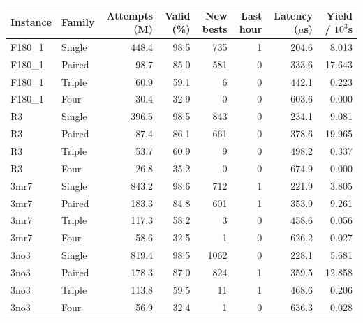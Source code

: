 \begin{tabular}{@{}llrrrrrr@{}}
\toprule
Instance & Family & Attempts (M) & Valid (\%) & New bests & Last hour & Latency ($\mu$s) & Yield / $10^3$s \\
\midrule
F180\_1 & Single & 448.4 & 98.5 & 735 & 1 & 204.6 & 8.013 \\
F180\_1 & Paired & 98.7 & 85.0 & 581 & 0 & 333.6 & 17.643 \\
F180\_1 & Triple & 60.9 & 59.1 & 6 & 0 & 442.1 & 0.223 \\
F180\_1 & Four & 30.4 & 32.9 & 0 & 0 & 603.6 & 0.000 \\
R3 & Single & 396.5 & 98.5 & 843 & 0 & 234.1 & 9.081 \\
R3 & Paired & 87.4 & 86.1 & 661 & 0 & 378.6 & 19.965 \\
R3 & Triple & 53.7 & 60.9 & 9 & 0 & 498.2 & 0.337 \\
R3 & Four & 26.8 & 35.2 & 0 & 0 & 674.9 & 0.000 \\
3mr7 & Single & 843.2 & 98.6 & 712 & 1 & 221.9 & 3.805 \\
3mr7 & Paired & 183.3 & 84.8 & 601 & 1 & 353.9 & 9.261 \\
3mr7 & Triple & 117.3 & 58.2 & 3 & 0 & 458.6 & 0.056 \\
3mr7 & Four & 58.6 & 32.5 & 1 & 0 & 626.2 & 0.027 \\
3no3 & Single & 819.4 & 98.5 & 1062 & 0 & 228.1 & 5.681 \\
3no3 & Paired & 178.3 & 87.0 & 824 & 1 & 359.5 & 12.858 \\
3no3 & Triple & 113.8 & 59.5 & 11 & 1 & 468.6 & 0.206 \\
3no3 & Four & 56.9 & 32.4 & 1 & 0 & 636.3 & 0.028 \\
\bottomrule
\end{tabular}
